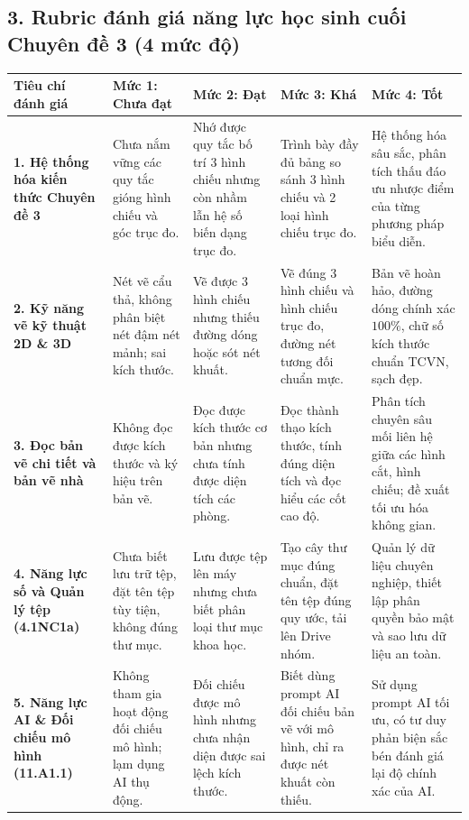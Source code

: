 \documentclass[12pt, a4paper]{article}
\begin{document}
\subsection*{3. Rubric đánh giá năng lực học sinh cuối Chuyên đề 3 (4 mức độ)}

\begin{center}
\small
\begin{tabularx}{\linewidth}{|p{3cm}|X|X|X|X|}
\hline
\textbf{Tiêu chí đánh giá} & \textbf{Mức 1: Chưa đạt} & \textbf{Mức 2: Đạt} & \textbf{Mức 3: Khá} & \textbf{Mức 4: Tốt} \\ \hline
\textbf{1. Hệ thống hóa kiến thức Chuyên đề 3} & Chưa nắm vững các quy tắc gióng hình chiếu và góc trục đo. & Nhớ được quy tắc bố trí 3 hình chiếu nhưng còn nhầm lẫn hệ số biến dạng trục đo. & Trình bày đầy đủ bảng so sánh 3 hình chiếu và 2 loại hình chiếu trục đo. & Hệ thống hóa sâu sắc, phân tích thấu đáo ưu nhược điểm của từng phương pháp biểu diễn. \\ \hline
\textbf{2. Kỹ năng vẽ kỹ thuật 2D \& 3D} & Nét vẽ cẩu thả, không phân biệt nét đậm nét mảnh; sai kích thước. & Vẽ được 3 hình chiếu nhưng thiếu đường dóng hoặc sót nét khuất. & Vẽ đúng 3 hình chiếu và hình chiếu trục đo, đường nét tương đối chuẩn mực. & Bản vẽ hoàn hảo, đường dóng chính xác $100\%$, chữ số kích thước chuẩn TCVN, sạch đẹp. \\ \hline
\textbf{3. Đọc bản vẽ chi tiết và bản vẽ nhà} & Không đọc được kích thước và ký hiệu trên bản vẽ. & Đọc được kích thước cơ bản nhưng chưa tính được diện tích các phòng. & Đọc thành thạo kích thước, tính đúng diện tích và đọc hiểu các cốt cao độ. & Phân tích chuyên sâu mối liên hệ giữa các hình cắt, hình chiếu; đề xuất tối ưu hóa không gian. \\ \hline
\textbf{4. Năng lực số và Quản lý tệp (4.1NC1a)} & Chưa biết lưu trữ tệp, đặt tên tệp tùy tiện, không đúng thư mục. & Lưu được tệp lên máy nhưng chưa biết phân loại thư mục khoa học. & Tạo cây thư mục đúng chuẩn, đặt tên tệp đúng quy ước, tải lên Drive nhóm. & Quản lý dữ liệu chuyên nghiệp, thiết lập phân quyền bảo mật và sao lưu dữ liệu an toàn. \\ \hline
\textbf{5. Năng lực AI \& Đối chiếu mô hình (11.A1.1)} & Không tham gia hoạt động đối chiếu mô hình; lạm dụng AI thụ động. & Đối chiếu được mô hình nhưng chưa nhận diện được sai lệch kích thước. & Biết dùng prompt AI đối chiếu bản vẽ với mô hình, chỉ ra được nét khuất còn thiếu. & Sử dụng prompt AI tối ưu, có tư duy phản biện sắc bén đánh giá lại độ chính xác của AI. \\ \hline
\end{tabularx}
\end{center}
\end{document}
